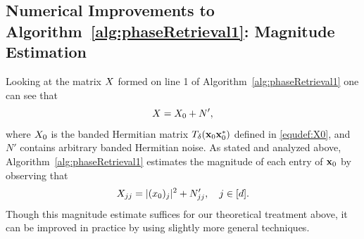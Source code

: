 \subsection{Numerical Improvements to Algorithm~\ref{alg:phaseRetrieval1}:  Magnitude Estimation}
\label{sec:MagEstImpNumerical}

Looking at the matrix $X$ formed on line 1 of Algorithm~\ref{alg:phaseRetrieval1} one can see that $$X= X_0 + N',$$ where $X_0$ is the banded Hermitian matrix $T_\delta(\mathbf x_0 \mathbf x_0^*)$ defined in \eqref{equdef:X0}, and $N'$ contains arbitrary banded Hermitian noise.  As stated and analyzed above, Algorithm~\ref{alg:phaseRetrieval1} estimates the magnitude of each entry of $\mathbf x_0$ by observing that $$X_{jj} = |(x_0)_{j}|^2 + N'_{jj}, \quad j \in [d].$$ Though this magnitude estimate suffices for our theoretical treatment above, it can be improved in practice by using slightly more general techniques.


